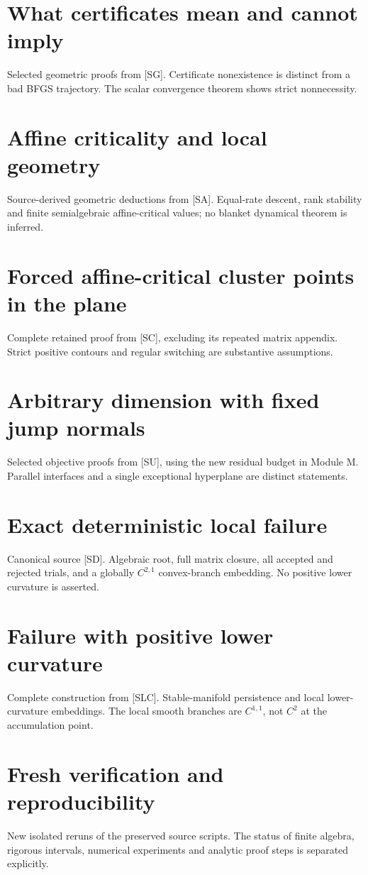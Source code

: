 \documentclass[10pt,oneside,openany]{book}
\newcommand{\ModuleTag}{I}
\theoremstyle{remark}\newtheorem{remark}{Remark}[chapter]
\newcommand{\StartModule}[3]{\cleardoublepage\renewcommand{\ModuleTag}{#1}\chapter{#2}\label{#1:chapter}\begin{small}\color{Accent}#3\end{small}\par\vspace{3pt}{\color{RuleGray}\hrule}\vspace{9pt}}
\begin{document}

\StartModule{G}{What certificates mean and cannot imply}{Selected geometric proofs from [SG]. Certificate nonexistence is distinct from a bad BFGS trajectory. The scalar convergence theorem shows strict nonnecessity.}

\StartModule{A}{Affine criticality and local geometry}{Source-derived geometric deductions from [SA]. Equal-rate descent, rank stability and finite semialgebraic affine-critical values; no blanket dynamical theorem is inferred.}

\StartModule{C}{Forced affine-critical cluster points in the plane}{Complete retained proof from [SC], excluding its repeated matrix appendix. Strict positive contours and regular switching are substantive assumptions.}

\StartModule{U}{Arbitrary dimension with fixed jump normals}{Selected objective proofs from [SU], using the new residual budget in Module M. Parallel interfaces and a single exceptional hyperplane are distinct statements.}

\StartModule{D}{Exact deterministic local failure}{Canonical source [SD]. Algebraic root, full matrix closure, all accepted and rejected trials, and a globally $C^{2,1}$ convex-branch embedding. No positive lower curvature is asserted.}

\StartModule{L}{Failure with positive lower curvature}{Complete construction from [SLC]. Stable-manifold persistence and local lower-curvature embeddings. The local smooth branches are $C^{1,1}$, not $C^2$ at the accumulation point.}

\StartModule{E}{Fresh verification and reproducibility}{New isolated reruns of the preserved source scripts. The status of finite algebra, rigorous intervals, numerical experiments and analytic proof steps is separated explicitly.}

\backmatter
\renewcommand{\ModuleTag}{B}
\cleardoublepage
{}
{}

\end{document}
